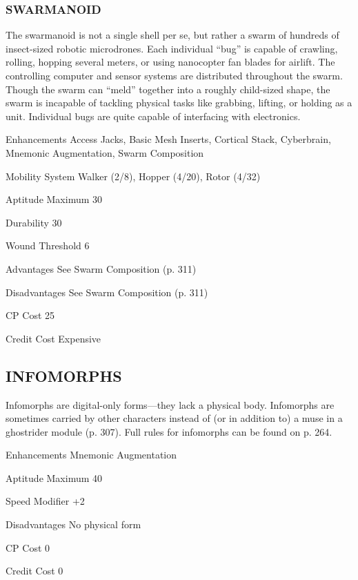 \subsubsection{SWARMANOID}
The swarmanoid is not a single shell per se, but rather a swarm of hundreds of
insect-sized robotic microdrones. Each individual “bug” is capable of
crawling, rolling, hopping several meters, or using nanocopter fan blades for
airlift. The controlling computer and sensor systems are distributed throughout
the swarm.  Though the swarm can “meld” together into a roughly child-sized
shape, the swarm is incapable of tackling physical tasks like grabbing,
lifting, or holding as a unit. Individual bugs are quite capable of interfacing
with electronics.

\begin{description*}
\item[Enhancements] Access Jacks, Basic Mesh Inserts, Cortical Stack,
  Cyberbrain, Mnemonic Augmentation, Swarm Composition
\item[Mobility System]  Walker (2/8), Hopper (4/20), Rotor (4/32) 
\item[Aptitude Maximum]  30 
\item[Durability]  30 
\item[Wound Threshold]  6 
\item[Advantages]  See Swarm Composition (p. 311) 
\item[Disadvantages]  See Swarm Composition (p. 311) 
\item[CP Cost]  25 
\item[Credit Cost] Expensive
\end{description*}

\subsection{INFOMORPHS}
Infomorphs are digital-only forms—they lack a physical body. Infomorphs are
sometimes carried by other characters instead of (or in addition to) a muse in
a ghostrider module (p. 307). Full rules for infomorphs can be found on p. 264.

\begin{description*}
\item[Enhancements]  Mnemonic Augmentation 
\item[Aptitude Maximum]  40 
\item[Speed Modifier]  +2 
\item[Disadvantages]  No physical form
\item[CP Cost]  0 
\item[Credit Cost] 0
\end{description*}

